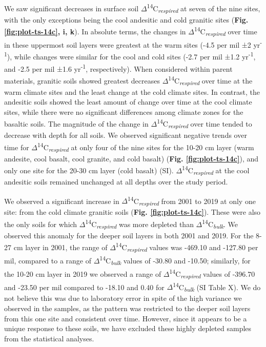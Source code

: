 \documentclass[english,man,floatsintext]{apa6}
\begin{document}
We saw significant decreases in surface soil \(\Delta\)\textsuperscript{14}C\textsubscript{\emph{respired}} at seven of the nine sites, with the only exceptions being the cool andesitic and cold granitic sites (\textbf{Fig. \ref{fig:plot-ts-14c}, i, k}). In absolute terms, the changes in \(\Delta\)\textsuperscript{14}C\textsubscript{\emph{respired}} over time in these uppermost soil layers were greatest at the warm sites (-4.5 per mil ±2 yr\textsuperscript{-1}), while changes were similar for the cool and cold sites (-2.7 per mil ±1.2 yr\textsuperscript{-1}, and -2.5 per mil ±1.6 yr\textsuperscript{-1}, respectively). When considered within parent materials, granitic soils showed greatest decreases \(\Delta\)\textsuperscript{14}C\textsubscript{\emph{respired}} over time at the warm climate sites and the least change at the cold climate sites. In contrast, the andesitic soils showed the least amount of change over time at the cool climate sites, while there were no significant differences among climate zones for the basaltic soils. The magnitude of the change in \(\Delta\)\textsuperscript{14}C\textsubscript{\emph{respired}} over time tended to decrease with depth for all soils. We observed significant negative trends over time for \(\Delta\)\textsuperscript{14}C\textsubscript{\emph{respired}} at only four of the nine sites for the 10-20 cm layer (warm andesite, cool basalt, cool granite, and cold basalt) (\textbf{Fig. \ref{fig:plot-ts-14c}}), and only one site for the 20-30 cm layer (cold basalt) (SI). \(\Delta\)\textsuperscript{14}C\textsubscript{\emph{respired}} at the cool andesitic soils remained unchanged at all depths over the study period.

We observed a significant increase in \(\Delta\)\textsuperscript{14}C\textsubscript{\emph{respired}} from 2001 to 2019 at only one site: from the cold climate granitic soils (\textbf{Fig. \ref{fig:plot-ts-14c}}). These were also the only soils for which \(\Delta\)\textsuperscript{14}C\textsubscript{\emph{respired}} was more depleted than \(\Delta\)\textsuperscript{14}C\textsubscript{\emph{bulk}}. We observed this anomaly for the deeper soil layers in both 2001 and 2019. For the 8-27 cm layer in 2001, the range of \(\Delta\)\textsuperscript{14}C\textsubscript{\emph{respired}} values was -469.10 and -127.80 per mil, compared to a range of \(\Delta\)\textsuperscript{14}C\textsubscript{\emph{bulk}} values of -30.80 and -10.50; similarly, for the 10-20 cm layer in 2019 we observed a range of \(\Delta\)\textsuperscript{14}C\textsubscript{\emph{respired}} values of -396.70 and -23.50 per mil compared to -18.10 and 0.40 for \(\Delta\)\textsuperscript{14}C\textsubscript{\emph{bulk}} (SI Table X). We do not believe this was due to laboratory error in spite of the high variance we observed in the samples, as the pattern was restricted to the deeper soil layers from this one site and consistent over time. However, since it appears to be a unique response to these soils, we have excluded these highly depleted samples from the statistical analyses.
\end{document}
